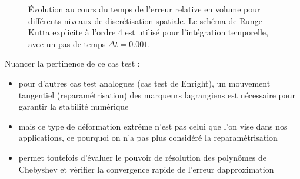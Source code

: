 \def\axw{0.48\textwidth}
\def\axh{0.39\textwidth}
\def\xlabl{$N$}%
\def\ylabl{Erreur}
\def\xsep{2pt}

\begin{figure}
  \centering
  \caption{Évolution au cours du temps de l'erreur relative en volume pour différents niveaux de discrétisation spatiale. Le schéma de Runge-Kutta explicite à l'ordre 4 est utilisé pour l'intégration temporelle, avec un pas de temps $\Delta t = 0.001$.}
  \label{fig:vortex_error_volume_vs_time}
\end{figure}

Nuancer la pertinence de ce cas test :
\begin{itemize}
	\item pour d'autres cas test analogues (\eg cas test de Enright), un mouvement tangentiel (reparamétrisation) des marqueurs lagrangiens est nécessaire pour garantir la stabilité numérique
	\item mais ce type de déformation extrême n'est pas celui que l'on vise dans nos applications, ce pourquoi on n'a pas plus considéré la reparamétrisation
	\item permet toutefois d'évaluer le pouvoir de résolution des polynômes de Chebyshev et vérifier la convergence rapide de l'erreur dapproximation
\end{itemize}

